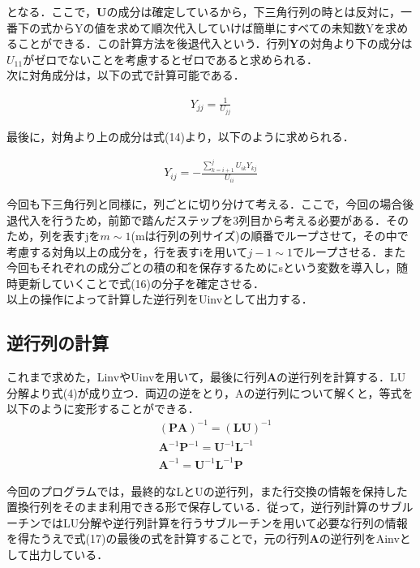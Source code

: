 \documentclass[dvipdfmx]{jsarticle}
\begin{document}
となる．ここで，$\boldsymbol{U}$の成分は確定しているから，下三角行列の時とは反対に，一番下の式からYの値を求めて順次代入していけば簡単にすべての未知数Yを求めることができる．この計算方法を後退代入という．行列$\boldsymbol{Y}$の対角より下の成分は$U_{11}$がゼロでないことを考慮するとゼロであると求められる．\\

次に対角成分は，以下の式で計算可能である．

\begin{align}
    Y_{jj}=\frac{1}{U_{jj}}
\end{align}

最後に，対角より上の成分は式(14)より，以下のように求められる．

\begin{align}
    Y_{ij}=-\frac{\sum_{k=i+1}^{j}U_{ik}Y_{kj}}{U_{ii}}
\end{align}

今回も下三角行列と同様に，列ごとに切り分けて考える．ここで，今回の場合後退代入を行うため，前節で踏んだステップを3列目から考える必要がある．そのため，列を表すjを$m \sim 1$(mは行列の列サイズ)の順番でループさせて，その中で考慮する対角以上の成分を，行を表すiを用いて$j-1 \sim 1$でループさせる．また今回もそれぞれの成分ごとの積の和を保存するためにsという変数を導入し，随時更新していくことで式(16)の分子を確定させる．\\
以上の操作によって計算した逆行列をUinvとして出力する．\\

\subsection{逆行列の計算}
これまで求めた，LinvやUinvを用いて，最後に行列$\boldsymbol{A}$の逆行列を計算する．LU分解より式(4)が成り立つ．両辺の逆をとり，Aの逆行列について解くと，等式を以下のように変形することができる．
\begin{equation}
    \begin{aligned}
        & (\boldsymbol{PA})^{-1}=(\boldsymbol{LU})^{-1}\\
        & \boldsymbol{A}^{-1}\boldsymbol{P}^{-1}=\boldsymbol{U}^{-1}\boldsymbol{L}^{-1}\\
        & \boldsymbol{A}^{-1}=\boldsymbol{U}^{-1}\boldsymbol{L}^{-1}\boldsymbol{P}
    \end{aligned}
\end{equation}

今回のプログラムでは，最終的なLとUの逆行列，また行交換の情報を保持した置換行列をそのまま利用できる形で保存している．従って，逆行列計算のサブルーチンではLU分解や逆行列計算を行うサブルーチンを用いて必要な行列の情報を得たうえで式(17)の最後の式を計算することで，元の行列$\boldsymbol{A}$の逆行列をAinvとして出力している．\\
\end{document}

